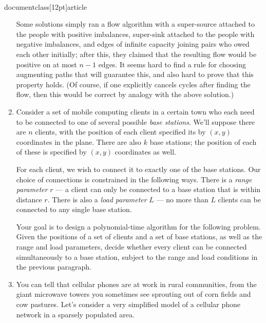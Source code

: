 \\documentclass[12pt]{article}
\begin{document}
\begin{enumerate}
{Some solutions simply ran a flow algorithm with
a super-source attached to the people with positive 
imbalances, super-sink attached to the people with negative imbalances,
and edges of infinite capacity joining pairs who owed each other initially;
after this, they claimed that the resulting flow would be
positive on at most $n-1$ edges.
It seems hard to find a rule for choosing augmenting paths that
will guarantee this, and also hard to prove that this property holds.
(Of course, if one explicitly cancels cycles after finding
the flow, then this would be correct by analogy with the above solution.)

}

\item 


Consider a set of mobile computing clients
in a certain town
who each need to be connected to one of several
possible {\em base stations}.
We'll suppose there are $n$ clients, with
the position of each client specified its by $(x,y)$
coordinates in the plane.
There are also $k$ base stations; the position of
each of these is specified by $(x,y)$ coordinates as well.

For each client, we wish to connect it to exactly one of the base stations.
Our choice of connections is constrained in the following ways.
There is a {\em range parameter} $r$ --- a client
can only be connected to a base station that is within distance $r$.
There is also a {\em load parameter} $L$ --- no more
than $L$ clients can be connected to any single base station.

Your goal is to design a polynomial-time algorithm for the
following problem.
Given the positions of a set of clients and a set of base
stations, as well as the range and load parameters,
decide whether every client can be connected
simultaneously to a base station,
subject to the range and load conditions in the previous paragraph.




\item 

You can tell that cellular phones are at work in rural communities,
from the giant microwave towers you sometimes see sprouting out
of corn fields and cow pastures.
Let's consider a very simplified model of a cellular phone network
in a sparsely populated area.


\end{enumerate}
\end{document}
